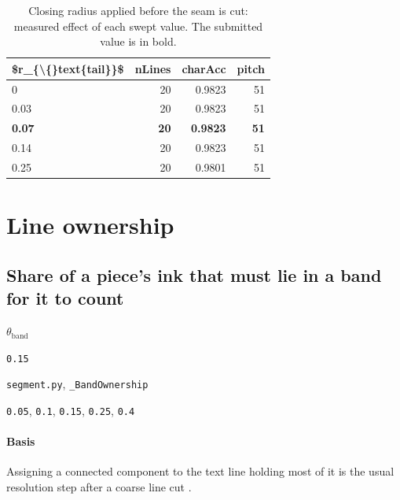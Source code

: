 \begin{table}[htbp]
\centering
\small
\caption{Closing radius applied before the seam is cut: measured effect of each swept value. The submitted value is in bold.}
\begin{tabular}{lrrr}
\toprule
\$r\_\{\textbackslash\{\}text\{tail\}\}\$ & \textsf{nLines} & \textsf{charAcc} & \textsf{pitch} \\
\midrule
0 & 20 & 0.9823 & 51 \\
0.03 & 20 & 0.9823 & 51 \\
\bfseries 0.07 & \bfseries 20 & \bfseries 0.9823 & \bfseries 51 \\
0.14 & 20 & 0.9823 & 51 \\
0.25 & 20 & 0.9801 & 51 \\
\bottomrule
\end{tabular}
\end{table}

\section{Line ownership}

\subsection{Share of a piece's ink that must lie in a band for it to count}

\label{coef:band-ink-share}

\begin{description}[leftmargin=5.2em,style=sameline]

\item[Symbol] $\theta_{\text{band}}$

\item[Value] \texttt{0.15}

\item[Source] \texttt{segment.py}, \texttt{\_BandOwnership}

\item[Swept] \texttt{0.05}, \texttt{0.1}, \texttt{0.15}, \texttt{0.25}, \texttt{0.4}

\end{description}

\paragraph{Basis}

Assigning a connected component to the text line holding most of it is the usual resolution step after a coarse line cut \cite{likforman2007}.

